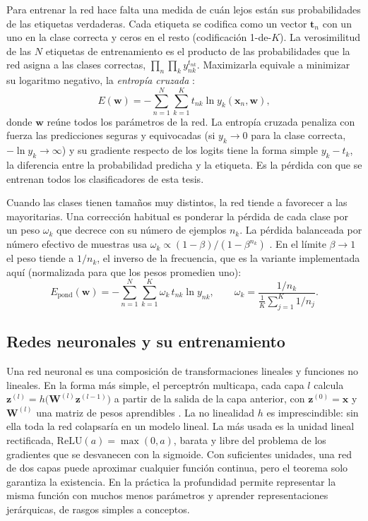 Para entrenar la red hace falta una medida de cuán lejos están sus
probabilidades de las etiquetas verdaderas. Cada etiqueta se codifica como
un vector $\mathbf{t}_n$ con un uno en la clase correcta y ceros en el resto
(codificación 1-de-$K$). La
verosimilitud de las $N$ etiquetas de entrenamiento es el producto de las
probabilidades que la red asigna a las clases correctas, $\prod_n \prod_k
y_{nk}^{t_{nk}}$. Maximizarla equivale a minimizar su logaritmo negativo, la
\emph{entropía cruzada} \citep[p.~162]{bishop2024deep}:
\begin{equation}
  E(\mathbf{w}) = -\sum_{n=1}^{N} \sum_{k=1}^{K} t_{nk} \ln y_k(\mathbf{x}_n, \mathbf{w}),
  \label{eq:ce}
\end{equation}
donde $\mathbf{w}$ reúne todos los parámetros de la red. La entropía cruzada
penaliza con fuerza las predicciones seguras y equivocadas (si $y_k \to 0$
para la clase correcta, $-\ln y_k \to \infty$) y su gradiente respecto de los
logits tiene la forma simple $y_k - t_k$, la diferencia entre la
probabilidad predicha y la etiqueta. Es la
pérdida con que se entrenan todos los clasificadores de esta tesis.

Cuando las clases tienen tamaños muy distintos, la red tiende a favorecer a
las mayoritarias. Una corrección habitual es ponderar la pérdida de cada
clase por un peso $\omega_k$ que decrece con su número de ejemplos $n_k$. La
pérdida balanceada por número efectivo de muestras usa $\omega_k \propto
(1-\beta)/(1-\beta^{n_k})$ \citep{cui2019classbalanced}. En el límite $\beta
\to 1$ el peso tiende a $1/n_k$, el inverso de la frecuencia, que es la
variante implementada aquí (normalizada para que los pesos promedien uno):
\begin{equation}
  E_{\mathrm{pond}}(\mathbf{w}) = -\sum_{n=1}^{N} \sum_{k=1}^{K} \omega_k\, t_{nk} \ln y_{nk},
  \qquad \omega_k = \frac{1/n_k}{\frac{1}{K}\sum_{j=1}^{K} 1/n_j}.
  \label{eq:ce-pond}
\end{equation}

\subsection{Redes neuronales y su entrenamiento}

Una red neuronal es una composición de transformaciones lineales y
funciones no lineales. En la forma más simple, el perceptrón multicapa, cada
capa $l$ calcula $\mathbf{z}^{(l)} = h\big(\mathbf{W}^{(l)} \mathbf{z}^{(l-1)}\big)$ a
partir de la salida de la capa anterior, con $\mathbf{z}^{(0)} = \mathbf{x}$ y
$\mathbf{W}^{(l)}$ una matriz de pesos aprendibles
\citep[pp.~181--187]{bishop2024deep}. La no linealidad $h$ es imprescindible: sin
ella toda la red colapsaría en un modelo lineal. La más usada es la unidad
lineal rectificada, $\mathrm{ReLU}(a) = \max(0, a)$, barata y libre del
problema de los gradientes que se desvanecen con la sigmoide. Con
suficientes unidades, una red de
dos capas puede aproximar cualquier función continua, pero el teorema solo
garantiza la existencia. En la práctica la profundidad permite representar
la misma función con muchos menos parámetros y aprender representaciones
jerárquicas, de rasgos simples a conceptos.

